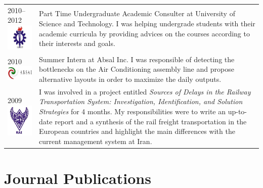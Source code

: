 \documentclass[10PT,letter]{article}
\newcommand{\numbox}[1]{} %
\begin{document}
\begin{tabular}{p{1.2in}p{5.55in}}
						\textsc{2010--2012}\vspace{1mm}\newline \includegraphics[width=1.5cm]{static/logos/IUST} &
										Part Time Undergraduate Academic Consulter  at University of Science and Technology. 
										I was helping undergrade students with their academic curricula by providing advices on the courses according to their interests and goals. \\[3mm]
										
						\textsc{2010}\vspace{1mm}\newline \includegraphics[width=1.95cm]{static/logos/ABSAL} &
										Summer Intern  at Absal Inc. 
										I was responsible of detecting the bottlenecks on the Air Conditioning assembly  line and propose alternative  layouts in order to maximize the daily outputs. \\[3mm]
						
						\textsc{2009} \vspace{1mm} \newline \includegraphics[width=1.4cm]{static/logos/RAI} & 
										I was involved in a project entitled \textit{Sources of Delays in the Railway Transportation System: Investigation, Identification, and Solution Strategies} for 4 months. My responsibilities were to write an up-to-date  report and a synthesis of the rail freight transportation in the European countries and highlight the main differences with the current management system at Iran.  

						
			\end{tabular}

            

\section*{\numbox{3}\bfseries\textcolor{titlecol}{\sffamily Journal Publications }}       
\end{document}
